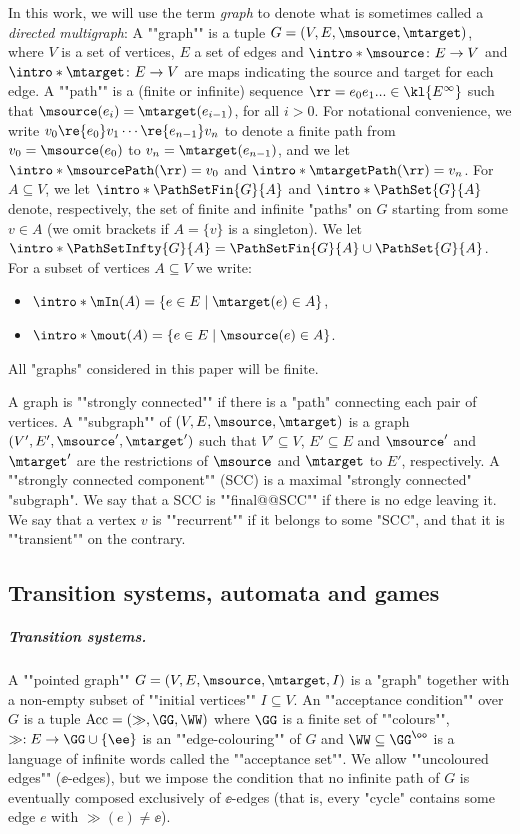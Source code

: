 \documentclass{theoretics}
\begin{document}
\AP In this work, we will use the term \emph{graph} to denote what is sometimes called a \emph{directed multigraph}: A ""graph"" is a tuple $G=(V,E,\msource,\mtarget)$, where $V$ is a set of vertices, $E$ a set of edges and $\intro*\msource\colon E\to  V$ and $\intro*\mtarget\colon E\to  V$ are maps indicating the source and target for each edge. 
\AP A ""path"" is a (finite or infinite) sequence $\rr = e_0e_1...\in \kl{E^\infty}$ such that  $\msource(e_{i})=\mtarget(e_{i-1})$, for all $i>0$. For notational convenience, we  write $v_0 \re {e_0} v_1 \cdots  \re{e_{n-1}} v_n$ to denote a finite path from $v_0 = \msource(e_0)$ to $v_n = \mtarget(e_{n-1})$, and we let $\intro*\msourcePath(\rr) = v_0$ and $\intro*\mtargetPath(\rr) = v_n$.
\AP For $A\subseteq V$, we let $\intro*\PathSetFin{G}{A}$ and $\intro*\PathSet{G}{A}$ denote, respectively, the set of finite and infinite "paths"  on $G$ starting from some $v\in A$ (we omit brackets if $A=\{v\}$ is a singleton).  We let $\intro*\PathSetInfty{G}{A} = \PathSetFin{G}{A}\cup \PathSet{G}{A}$.
\AP For a subset of vertices $A\subseteq V$ we write:
\begin{itemize}
	\item $\intro*\mIn(A)=\{ e\in E \mid \mtarget(e)\in A \}$,
	\item $\intro*\mout(A)=\{ e\in E \mid \msource(e)\in A \}$.
\end{itemize}



All "graphs" considered in this paper will be finite.

\AP A graph is ""strongly connected"" if there is a "path" connecting each pair of vertices. \AP A ""subgraph"" of $(V,E,\msource,\mtarget)$ is a graph $(V',E',\msource',\mtarget')$ such that $V'\subseteq V$, $E'\subseteq E$ and $\msource'$ and $\mtarget'$ are the restrictions  of $\msource$ and $\mtarget$ to $E'$, respectively. A ""strongly connected component"" (SCC) is a maximal "strongly connected" "subgraph". We say that a SCC is ""final@@SCC"" if there is no edge leaving it.
\AP We say that a vertex $v$ is ""recurrent"" if it belongs to some "SCC", and that it is ""transient"" on the contrary.




\subsection{Transition systems, automata and games}\label{subsect-prelim:transition-systems}

\subparagraph*{Transition systems.}
\AP A ""pointed graph"" $G = (V,E, \msource, \mtarget, I)$ is a "graph" %
 together with a non-empty subset of ""initial vertices"" $I\subseteq V$.
\AP An ""acceptance condition"" over $G$ is a tuple $\mathrm{Acc} = (\gg, \GG, \WW)$ where $\GG$ is a finite set of ""colours"", $\gg:E\to \GG\cup\{\ee\}$ is an ""edge-colouring"" of $G$ and $\WW\subseteq \GG^\oo$ is a language of infinite words called the ""acceptance set"". We allow ""uncoloured edges"" ($\ee$-edges), but we impose the condition that no infinite path of $G$ is eventually composed exclusively of $\ee$-edges (that is, every "cycle" contains some edge $e$ with $\gg(e)\neq \ee$). 
\end{document}

